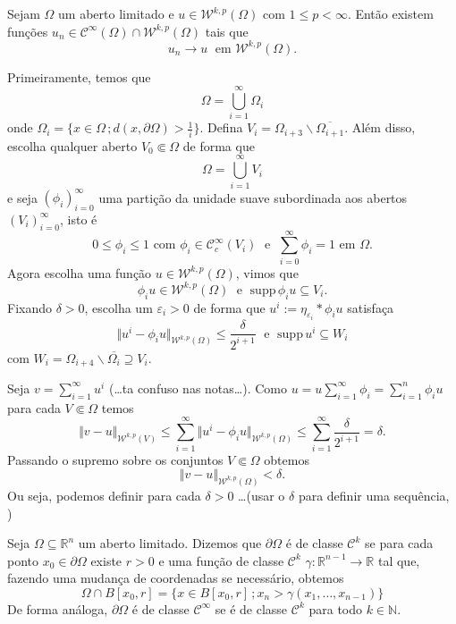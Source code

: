 \documentclass[a4paper, 11pt]{book}
\theoremstyle{definition}
\newcommand{\bN}{\mathbb{N}}
\newcommand{\bR}{\mathbb{R}}
\newcommand{\cC}{\mathcal{C}}
\newcommand{\cW}{\mathcal{W}}
\newcommand{\supp}{\mathrm{supp}\,}
\begin{document}
\begin{tbox}
    Sejam $\Omega$ um aberto limitado e $u \in \cW^{k,p}(\Omega)$ com $1 \leqslant p < \infty$.
    Então existem funções $u_n \in \cC^{\infty}(\Omega) \cap \cW^{k,p}(\Omega)$ tais que
    \[
        u_n \to u \;\text{ em } \cW^{k,p}(\Omega).
    \] 
\end{tbox}
\begin{prf}
    Primeiramente, temos que
    \[
        \Omega = \bigcup_{i=1}^\infty \Omega_i   
    \]
    onde $\Omega_i = \{x \in \Omega \,; d(x, \partial\Omega) > \tfrac{1}{i}\}$. Defina $V_i = \Omega_{i+3} \smallsetminus \overline{\Omega_{i+1}}$.
    Além disso, escolha qualquer aberto $V_0 \Subset \Omega$ de forma que
    \[
        \Omega = \bigcup_{i=1}^\infty V_i
    \]
    e seja $(\phi_i)_{i=0}^\infty$ uma partição da unidade suave subordinada aos abertos $(V_i)_{i=0}^\infty$, isto é
    \[
       0 \leqslant \phi_i \leqslant 1 \text{ com } \phi_i \in \cC^\infty_c(V_i) \;\text{ e }\; \sum_{i=0}^\infty \phi_i = 1 \text{ em } \Omega.
    \]
    Agora escolha uma função $u \in \cW^{k,p}(\Omega)$, vimos que
    \[
        \phi_i u \in \cW^{k,p}(\Omega) \;\text{ e }\; \supp \phi_i u \subseteq V_i.
    \]
    Fixando $\delta > 0$, escolha um $\varepsilon_i > 0$ de forma que $u^i := \eta_{\varepsilon_i} * \phi_i u$ satisfaça
    \[
        \Vert u^i - \phi_i u \Vert_{\cW^{k,p}(\Omega)} \leqslant \frac{\delta}{2^{i+1}} \;\text{ e }\; \supp u^i \subseteq W_i
    \]
    com $W_i = \Omega_{i+4} \smallsetminus \overline{\Omega_{i}} \supseteq V_i$.

    Seja $v = \sum_{i=1}^\infty u^i$ (\dots ta confuso nas notas\dots).
    Como $u = u \sum_{i=1}^\infty \phi_i = \sum_{i=1}^n \phi_i u$ para cada $V \Subset \Omega$ temos
    \[
        \Vert v - u \Vert_{\cW^{k,p}(V)} \leqslant \sum_{i=1}^\infty \Vert u^i - \phi_i u \Vert_{\cW^{k,p}(\Omega)} \leqslant \sum_{i=1}^\infty \frac{\delta}{2^{i+1}} = \delta.
    \]
    Passando o supremo sobre os conjuntos $V \Subset \Omega$ obtemos
    \[
        \Vert v - u \Vert_{\cW^{k,p}(\Omega)} < \delta.
    \]
    Ou seja, podemos definir para cada $\delta > 0$ \dots (usar o $\delta$ para definir uma sequência, )

\end{prf}

\begin{dbox} \label{def:fronteira-ck}
    Seja $\Omega \subseteq \bR^n$ um aberto limitado. 
    Dizemos que $\partial \Omega$ é de classe $\cC^k$ se para cada ponto $x_0 \in \partial \Omega$ existe $r > 0$ e uma função de classe $\cC^k$ $\gamma : \bR^{n-1} \to \bR$ tal que, fazendo uma mudança de coordenadas se necessário, obtemos
    \[
        \Omega \cap B[x_0,r] = \{x \in B[x_0,r] \,; x_n > \gamma(x_1,\dots,x_{n-1})\}
    \]
    De forma análoga, $\partial\Omega$ é de classe $\cC^\infty$ se é de classe $\cC^k$ para todo $k \in \bN$.
\end{dbox}
\end{document}
